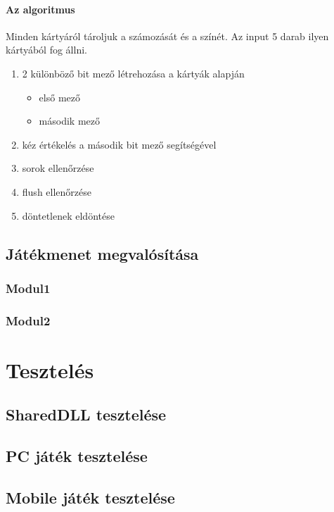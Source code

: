 \documentclass[]{thesis-ekf}
\theoremstyle{definition}
\theoremstyle{remark}
\begin{document}
\subsubsection{Az algoritmus}

Minden kártyáról tároljuk a számozását és a színét. Az input 5 darab ilyen kártyából fog állni.

\begin{enumerate}
	\item 2 különböző bit mező létrehozása a kártyák alapján
	\begin{itemize}
		\item első mező
		\item második mező
	\end{itemize}
	\item kéz értékelés a második bit mező segítségével
	\item sorok ellenőrzése
	\item flush ellenőrzése
	\item döntetlenek eldöntése
\end{enumerate}



\section{Játékmenet megvalósítása}

\subsection{Modul1}
\subsection{Modul2}

\chapter{Tesztelés}

\section{SharedDLL tesztelése}
\section{PC játék tesztelése}
\section{Mobile játék tesztelése}
\end{document}
